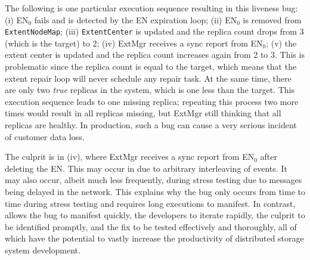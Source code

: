 The following is one particular execution sequence resulting in this liveness bug: (i) EN$_0$ fails and is detected by the EN expiration loop; (ii) EN$_0$ is removed from \texttt{ExtentNodeMap}; (iii) \texttt{ExtentCenter} is updated and the replica count drops from 3 (which is the target) to 2; (iv) ExtMgr receives a sync report from EN$_0$; (v) the extent center is updated and the replica count increases again from 2 to 3. This is problematic since the replica count is equal to the target, which means that the extent repair loop will never schedule any repair task. At the same time, there are only two \emph{true} replicas in the system, which is one less than the target. This execution sequence leads to one missing replica; repeating this process two more times would result in all replicas missing, but ExtMgr still thinking that all replicas are healthy. In production, such a bug can cause a very serious incident of customer data loss.

The culprit is in (iv), where ExtMgr receives a sync report from EN$_0$ after deleting the EN. This may occur in \psharp due to arbitrary interleaving of events. It may also occur, albeit much less frequently, during stress testing due to messages being delayed in the network. This explains why the bug only occurs from time to time during stress testing and requires long executions to manifest. In contrast, \psharp allows the bug to manifest quickly, the developers to iterate rapidly, the culprit to be identified promptly, and the fix to be tested effectively and thoroughly, all of which have the potential to vastly increase the productivity of distributed storage system development.
